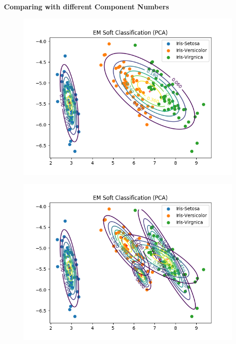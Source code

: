\documentclass[a4paper]{article}
\begin{document}
\newpage

{\large \textbf{Comparing with different Component Numbers}} \\


\begin{figure}[htp]
\centering
\begin{minipage}{0.4\textwidth}
  \includegraphics[scale=0.5]{plots/gauss_sc3_c2.png}
  \label{fig:16}
\end{minipage}
\hfill
\begin{minipage}{0.4\textwidth}
  \includegraphics[scale=0.5]{plots/gauss_sc3_c5.png}
  \label{fig:17}
\end{minipage}
\end{figure} 
\end{document}
